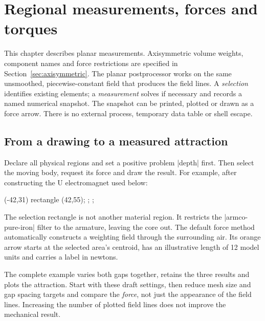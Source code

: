 \section{Regional measurements, forces and torques}
\label{sec:postprocessing}
This chapter describes planar measurements. Axisymmetric volume weights,
component names and force restrictions are specified in Section~\ref{sec:axisymmetric}.
The planar postprocessor works on the same unsmoothed, piecewise-constant field that
produces the field lines. A \emph{selection} identifies existing elements;
a \emph{measurement} solves if necessary and records a named numerical snapshot.
The snapshot can be printed, plotted or drawn as a force arrow. There is no
external process, temporary data table or shell escape.

\subsection{From a drawing to a measured attraction}
Declare all physical regions and set a positive problem |depth| first. Then
select the moving body, request its force and draw the result. For example,
after constructing the U electromagnet used below:
\begin{codeexample}
\path[femm/selection={name=armature,material=armco-pure-iron}]
  (-42,31) rectangle (42,55);
\path[femm/measure={name=pull,selection=armature,quantity=force}];
;
\end{codeexample}
The selection rectangle is not another material region. It restricts the
|armco-pure-iron| filter to the armature, leaving the core out. The default force
method automatically constructs a weighting field through the surrounding air.
Its orange arrow starts at the selected area's centroid, has an illustrative
length of 12 model units and carries a label in newtons.

The complete example varies both gaps together, retains the three results and
plots the attraction. Start with these draft settings, then reduce mesh size
and gap spacing targets and compare the \emph{force}, not just the appearance
of the field lines. Increasing the number of plotted field lines does not
improve the mechanical result.

